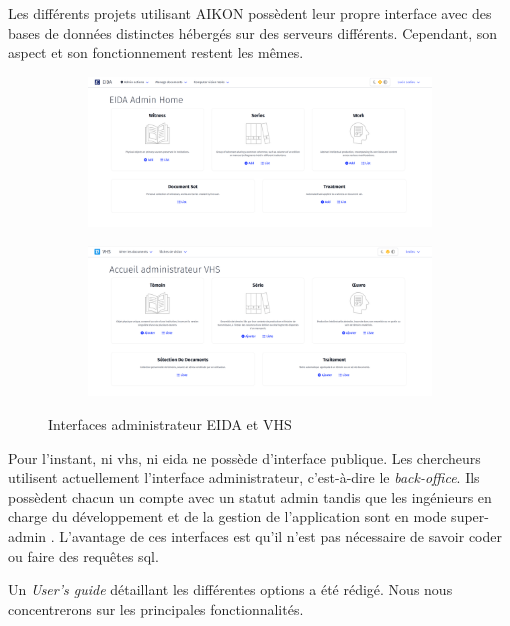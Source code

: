 Les différents projets utilisant AIKON possèdent leur propre interface avec des bases de données distinctes hébergés sur des serveurs différents. Cependant, son aspect et son fonctionnement restent les mêmes.

\begin{figure}[h]
	\centering
	\begin{subfigure}{0.48\linewidth}
		\centering
		\includegraphics[width=\linewidth]{images/accueil_eida.png}
	\end{subfigure}
	\hfill
	\begin{subfigure}{0.48\linewidth}
		\centering
		\includegraphics[width=\linewidth]{images/accueil_vhs.png}
	\end{subfigure}
	\caption{Interfaces administrateur EIDA et VHS}
	\label{fig:interface_accueil}
\end{figure}

Pour l'instant, ni \gls{vhs}, ni \gls{eida} ne possède d'interface publique. Les chercheurs utilisent actuellement l'interface administrateur, c'est-à-dire le \textit{back-office}. Ils possèdent chacun un compte avec un statut \og admin \fg tandis que les ingénieurs en charge du développement et de la gestion de l'application sont en mode \og super-admin \fg. L'avantage de ces interfaces est qu'il n'est pas nécessaire de savoir coder ou faire des requêtes \gls{sql}.

Un \textit{User's guide} détaillant les différentes options a été rédigé. Nous nous concentrerons sur les principales fonctionnalités.




